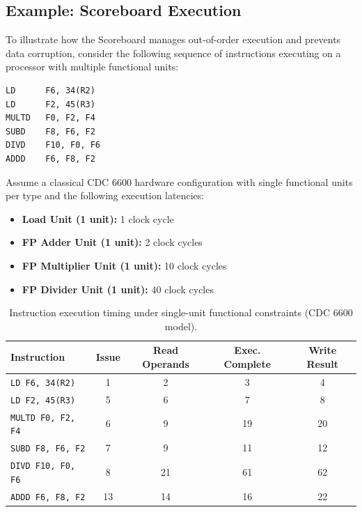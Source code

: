 \subsection{Example: Scoreboard Execution}

To illustrate how the Scoreboard manages out-of-order execution and prevents data corruption, consider the following sequence of instructions executing on a processor with multiple functional units:

\begin{lstlisting}[language={[x86masm]Assembler}]
LD      F6, 34(R2)
LD      F2, 45(R3)
MULTD   F0, F2, F4
SUBD    F8, F6, F2
DIVD    F10, F0, F6
ADDD    F6, F8, F2
\end{lstlisting}

Assume a classical CDC 6600 hardware configuration with single functional units per type and the following execution latencies:
\begin{itemize}
    \item \textbf{Load Unit (1 unit):} 1 clock cycle
    \item \textbf{FP Adder Unit (1 unit):} 2 clock cycles
    \item \textbf{FP Multiplier Unit (1 unit):} 10 clock cycles
    \item \textbf{FP Divider Unit (1 unit):} 40 clock cycles
\end{itemize}

\begin{table}[htpb]
    \centering
    \renewcommand{\arraystretch}{1.2}
    \begin{tabular}{l c c c c}
        \textbf{Instruction} & \textbf{Issue} & \textbf{Read Operands} & \textbf{Exec. Complete} & \textbf{Write Result} \\
        \hline
        \texttt{LD   F6, 34(R2)}  & 1  & 2  & 3  & 4  \\
        \texttt{LD   F2, 45(R3)}  & 5  & 6  & 7  & 8  \\
        \texttt{MULTD F0, F2, F4} & 6  & 9  & 19 & 20 \\
        \texttt{SUBD  F8, F6, F2} & 7  & 9  & 11 & 12 \\
        \texttt{DIVD  F10, F0, F6}& 8  & 21 & 61 & 62 \\
        \texttt{ADDD  F6, F8, F2} & 13 & 14 & 16 & 22 \\
        \hline
    \end{tabular}
    \caption{Instruction execution timing under single-unit functional constraints (CDC 6600 model).}
    \label{tab:scoreboard-timing}
\end{table}

